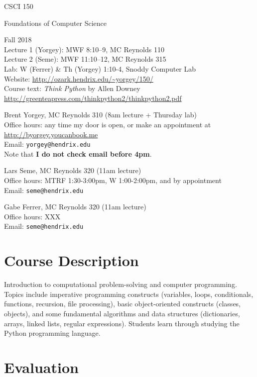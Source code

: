 \documentclass{article}
\begin{document}
{\Large
\noindent CSCI 150 \smallskip

\noindent Foundations of Computer Science \bigskip
}

\noindent Fall 2018 \\
Lecture 1 (Yorgey): MWF 8:10--9, MC Reynolds 110\\
Lecture 2 (Seme): MWF 11:10--12, MC Reynolds 315\\
Lab: W (Ferrer) \& Th (Yorgey) 1:10-4, Snoddy Computer Lab\\
Website: \url{http://ozark.hendrix.edu/~yorgey/150/} \\
Course text: \emph{Think Python} by Allen Downey \\
\indent \url{http://greenteapress.com/thinkpython2/thinkpython2.pdf}
\medskip

\noindent Brent Yorgey, MC Reynolds 310 (8am lecture + Thursday lab)\\
Office hours: any time my door is open, or make an appointment at \\
\indent \url{http://byorgey.youcanbook.me} \\
Email: \texttt{yorgey@hendrix.edu} \\
Note that \textbf{I do not check email before 4pm}.\medskip

\noindent Lars Seme, MC Reynolds 320 (11am lecture)\\
Office hours: MTRF 1:30-3:00pm, W 1:00-2:00pm, and by appointment \\
Email: \texttt{seme@hendrix.edu}

\noindent Gabe Ferrer, MC Reynolds 320 (11am lecture)\\
Office hours: XXX \\
Email: \texttt{seme@hendrix.edu}


\section*{Course Description}

Introduction to computational problem-solving and computer
programming. Topics include imperative programming constructs
(variables, loops, conditionals, functions, recursion, file
processing), basic object-oriented constructs (classes, objects), and
some fundamental algorithms and data structures (dictionaries, arrays,
linked lists, regular expressions). Students learn through studying
the Python programming language.

\section*{Evaluation}
\end{document}
